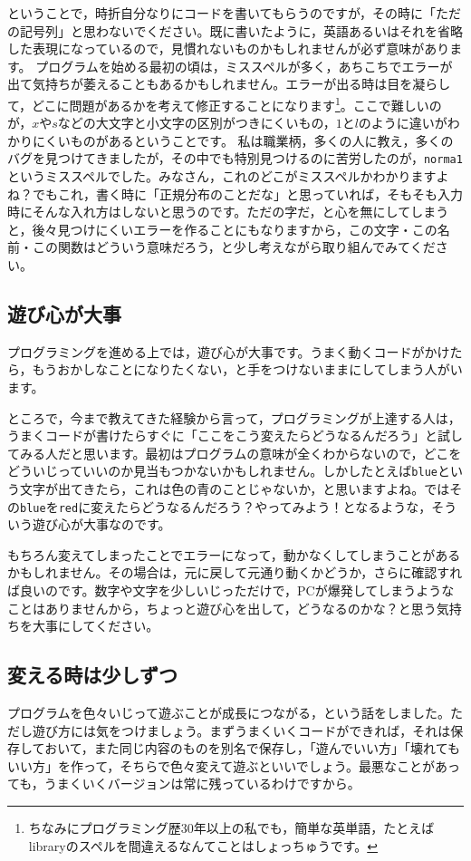 \documentclass{ltjsbook}
\begin{document}
ということで，時折自分なりにコードを書いてもらうのですが，その時に「ただの記号列」と思わないでください。既に書いたように，英語あるいはそれを省略した表現になっているので，見慣れないものかもしれませんが必ず意味があります。
プログラムを始める最初の頃は，ミススペルが多く，あちこちでエラーが出て気持ちが萎えることもあるかもしれません。エラーが出る時は目を凝らして，どこに問題があるかを考えて修正することになります\footnote{ちなみにプログラミング歴30年以上の私でも，簡単な英単語，たとえばlibraryのスペルを間違えるなんてことはしょっちゅうです。}。ここで難しいのが，$x$や$s$などの大文字と小文字の区別がつきにくいもの，$1$と$l$のように違いがわかりにくいものがあるということです。
私は職業柄，多くの人に教え，多くのバグを見つけてきましたが，その中でも特別見つけるのに苦労したのが，\texttt{norma1}というミススペルでした。みなさん，これのどこがミススペルかわかりますよね？でもこれ，書く時に「正規分布のことだな」と思っていれば，そもそも入力時にそんな入れ方はしないと思うのです。ただの字だ，と心を無にしてしまうと，後々見つけにくいエラーを作ることにもなりますから，この文字・この名前・この関数はどういう意味だろう，と少し考えながら取り組んでみてください。

\subsection{遊び心が大事}
プログラミングを進める上では，遊び心が大事です。うまく動くコードがかけたら，もうおかしなことになりたくない，と手をつけないままにしてしまう人がいます。

ところで，今まで教えてきた経験から言って，プログラミングが上達する人は，うまくコードが書けたらすぐに「ここをこう変えたらどうなるんだろう」と試してみる人だと思います。最初はプログラムの意味が全くわからないので，どこをどういじっていいのか見当もつかないかもしれません。しかしたとえば\texttt{blue}という文字が出てきたら，これは色の青のことじゃないか，と思いますよね。ではその\texttt{blue}を\texttt{red}に変えたらどうなるんだろう？やってみよう！となるような，そういう遊び心が大事なのです。

もちろん変えてしまったことでエラーになって，動かなくしてしまうことがあるかもしれません。その場合は，元に戻して元通り動くかどうか，さらに確認すれば良いのです。数字や文字を少しいじっただけで，PCが爆発してしまうようなことはありませんから，ちょっと遊び心を出して，どうなるのかな？と思う気持ちを大事にしてください。

\subsection{変える時は少しずつ}
プログラムを色々いじって遊ぶことが成長につながる，という話をしました。ただし遊び方には気をつけましょう。まずうまくいくコードができれば，それは保存しておいて，また同じ内容のものを別名で保存し，「遊んでいい方」「壊れてもいい方」を作って，そちらで色々変えて遊ぶといいでしょう。最悪なことがあっても，うまくいくバージョンは常に残っているわけですから。
\end{document}
